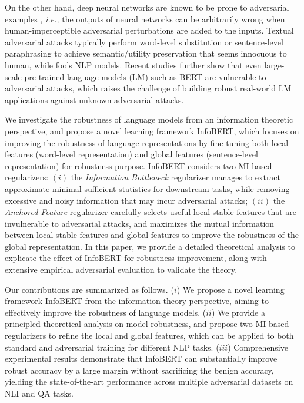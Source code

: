 \documentclass{article} \usepackage{iclr2021_conference,times}
\theoremstyle{definition}
\theoremstyle{remark}
\newcommand{\method}{InfoBERT\xspace}
\begin{document}
On the other hand, deep neural networks are known to be prone to adversarial examples \citep{Goodfellow2015ExplainingAH,Papernot2016DistillationAA,Eykholt2017RobustPA,MoosaviDezfooli2016DeepFoolAS}, \emph{i.e.,} the outputs of neural networks can be arbitrarily wrong when human-imperceptible adversarial perturbations are added to the inputs. Textual adversarial attacks typically perform word-level substitution \citep{hotflip, DBLP:conf/emnlp/AlzantotSEHSC18,weight_attack} or sentence-level paraphrasing \citep{scpn,DBLP:conf/naacl/ZhangBH19} to achieve semantic/utility preservation that seems innocuous to human, while fools NLP models. Recent studies \citep{textfooler, comattack, anli, t3} further show that even large-scale pre-trained language models (LM) such as BERT are vulnerable to adversarial attacks, which raises the challenge of building robust real-world LM applications against unknown adversarial attacks.

We investigate the robustness of language models from an information theoretic perspective, and propose a novel learning framework \method, which focuses on improving the robustness of language representations by fine-tuning both local features (word-level representation) and global features (sentence-level representation) for robustness purpose. \method considers two MI-based regularizers: $(i)$ the \emph{Information Bottleneck} regularizer manages to extract approximate minimal sufficient statistics for downstream tasks, while removing excessive and noisy information that may incur adversarial attacks; $(ii)$ the \emph{Anchored Feature} regularizer carefully selects useful local stable features that are invulnerable to adversarial attacks, and maximizes the mutual information between local stable features and global features to improve the robustness of the global representation. In this paper, we provide a detailed theoretical analysis to explicate the effect of \method for robustness improvement, along with extensive empirical adversarial evaluation to validate the theory.

Our contributions are summarized as follows. ($i$) We propose a novel learning framework \method from the information theory perspective, aiming to effectively improve the robustness of language models. ($ii$) We provide a principled theoretical analysis on model robustness, and propose two MI-based regularizers to refine the local and global features, which can be applied to both standard and adversarial training for different NLP tasks. ($iii$) Comprehensive experimental results demonstrate that \method can substantially improve robust accuracy by a large margin without sacrificing the benign accuracy, yielding the state-of-the-art performance across multiple adversarial datasets on NLI and QA tasks.  \vspace{-1mm} 
\end{document}
